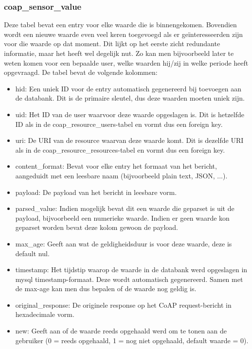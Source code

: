 \subsubsection{coap\_sensor\_value}
Deze tabel bevat een entry voor elke waarde die is binnengekomen. Bovendien wordt een nieuwe waarde even veel keren toegevoegd als er ge\"{i}nteresseerden zijn voor die waarde op dat moment. Dit lijkt op het eerste zicht redundante informatie, maar het heeft wel degelijk nut. Zo kan men bijvoorbeeld later te weten komen voor een bepaalde user, welke waarden hij/zij in welke periode heeft opgevraagd. De tabel bevat de volgende kolommen:
\begin{itemize}
\item hid: Een uniek ID voor de entry automatisch gegenereerd bij toevoegen aan de databank. Dit is de primaire sleutel, dus deze waarden moeten uniek zijn.
\item uid: Het ID van de user waarvoor deze waarde opgeslagen is. Dit is hetzelfde ID als in de coap\_resource\_users-tabel en vormt dus een foreign key.
\item uri: De URI van de resource waarvan deze waarde komt. Dit is dezelfde URI als in de coap\_resource\_resources-tabel en vormt dus een foreign key.
\item content\_format: Bevat voor elke entry het formaat van het bericht, aangeduidt met een leesbare naam (bijvoorbeeld plain text, JSON, ...). 
\item payload: De payload van het bericht in leesbare vorm.
\item parsed\_value: Indien mogelijk bevat dit een waarde die geparset is uit de payload, bijvoorbeeld een numerieke waarde. Indien er geen waarde kon geparset worden bevat deze kolom gewoon de payload.
\item max\_age: Geeft aan wat de geldigheidsduur is voor deze waarde, deze is default nul.
\item timestamp: Het tijdstip waarop de waarde in de databank werd opgeslagen in mysql timestamp-formaat. Deze wordt automatisch gegenereerd. Samen met de max-age kan men dus bepalen of de waarde nog geldig is.
\item original\_response: De originele response op het CoAP request-bericht in hexadecimale vorm.
\item new: Geeft aan of de waarde reeds opgehaald werd om te tonen aan de gebruiker (0 = reeds opgehaald, 1 = nog niet opgehaald, default waarde = 0).
\end{itemize}

